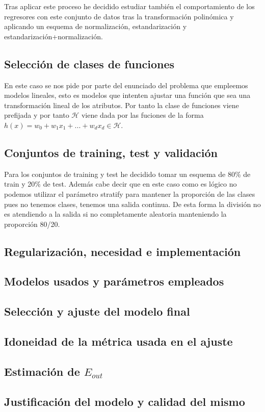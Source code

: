 \documentclass[12pt,a4paper]{article}
\begin{document}
Tras aplicar este proceso he decidido estudiar también el comportamiento de los regresores con este conjunto de datos tras la transformación polinómica y aplicando un esquema de normalización, estandarización y estandarización+normalización.

\subsection{Selección de clases de funciones}

En este caso se nos pide por parte del enunciado del problema que empleemos modelos lineales, esto es modelos que intenten ajustar una función que sea una transformación lineal de los atributos. Por tanto la clase de funciones viene prefijada y por tanto $\mathcal{H}$ viene dada por las fuciones de la forma $h(x) = w_0 + w_1 x_1 + ... + w_d x_d \in \mathcal{H}$.

\subsection{Conjuntos de training, test y validación}

Para los conjuntos de training y test he decidido tomar un esquema de 80\% de train y 20\% de test. Además cabe decir que en este caso como es lógico no podemos utilizar el parámetro stratify para mantener la proporción de las clases pues no tenemos clases, tenemos una salida continua. De esta forma la división no es atendiendo a la salida si no completamente aleatoria manteniendo la proporción 80/20.

\subsection{Regularización, necesidad e implementación}

\subsection{Modelos usados y parámetros empleados}

\subsection{Selección y ajuste del modelo final}

\subsection{Idoneidad de la métrica usada en el ajuste}

\subsection{Estimación de $E_{out}$}

\subsection{Justificación del modelo y calidad del mismo}
\end{document}
